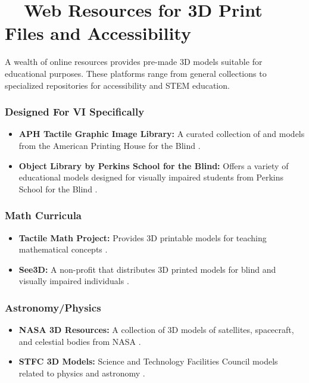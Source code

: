 \section{~~Web Resources for 3D Print Files and Accessibility}\label{ch5:sec:web-resources}
A wealth of online resources provides pre-made 3D models suitable for educational purposes. These platforms range from general collections to specialized repositories for accessibility and STEM education.

\subsubsection{Designed For VI Specifically}
\begin{itemize}
	\item \textbf{APH Tactile Graphic Image Library:} A curated collection of  and models from the American Printing House for the Blind \supercite{APH}.
	\item \textbf{Object Library by Perkins School for the Blind:} Offers a variety of educational models designed for visually impaired students from Perkins School for the Blind \supercite{PerkinsElearning}.
\end{itemize}

\subsubsection{Math Curricula}
\begin{itemize}
	\item \textbf{Tactile Math Project:} Provides 3D printable models for teaching mathematical concepts \supercite{TactileMath}.
	\item \textbf{See3D:} A non-profit that distributes 3D printed models for blind and visually impaired individuals \supercite{See3D}.
\end{itemize}

\subsubsection{Astronomy/Physics}
\begin{itemize}
	\item \textbf{NASA 3D Resources:} A collection of 3D models of satellites, spacecraft, and celestial bodies from NASA \supercite{NASA3D}.
	\item \textbf{STFC 3D Models:} Science and Technology Facilities Council models related to physics and astronomy \supercite{STFC}.
\end{itemize}

